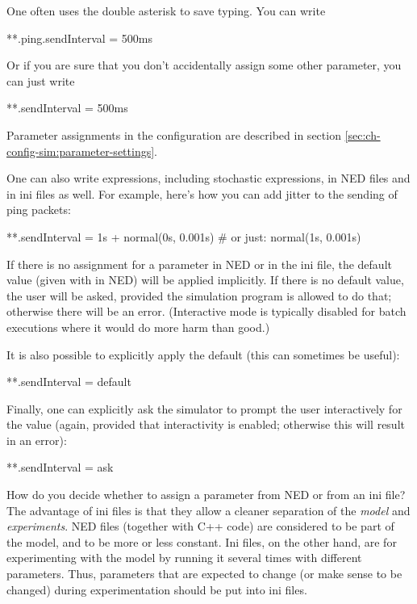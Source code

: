 One often uses the double asterisk to save typing. You can write

\begin{inifile}
**.ping.sendInterval = 500ms
\end{inifile}

Or if you are sure that you don't accidentally assign some other
 parameter, you can just write

\begin{inifile}
**.sendInterval = 500ms
\end{inifile}

Parameter assignments in the configuration are described in section
\ref{sec:ch-config-sim:parameter-settings}.

One can also write expressions, including stochastic expressions, in
NED files and in ini files as well. For example, here's how you can
add jitter to the sending of ping packets:

\begin{inifile}
**.sendInterval = 1s + normal(0s, 0.001s)  # or just: normal(1s, 0.001s)
\end{inifile}

If there is no assignment for a parameter in NED or in the ini file, the
default value (given with  in NED) will be applied
implicitly. If there is no default value, the user will be asked, provided
the simulation program is allowed to do that; otherwise there will be an
error. (Interactive mode is typically disabled for batch executions where
it would do more harm than good.)

It is also possible to explicitly apply the default (this can sometimes
be useful):

\begin{inifile}
**.sendInterval = default
\end{inifile}

Finally, one can explicitly ask the simulator to prompt the user interactively
for the value (again, provided that interactivity is enabled; otherwise
this will result in an error):

\begin{inifile}
**.sendInterval = ask
\end{inifile}

\begin{note}
    How do you decide whether to assign a parameter from NED or from an ini
    file? The advantage of ini files is that they allow a cleaner separation of the \textit{model}
    and \textit{experiments}. NED files (together with C++ code) are considered
    to be part of the model, and to be more or less constant. Ini files, on
    the other hand, are for experimenting with the model by running it
    several times with different parameters. Thus, parameters that are expected
    to change (or make sense to be changed) during experimentation should be
    put into ini files.
\end{note}


